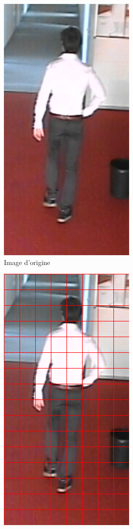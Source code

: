 \documentclass[12pt]{article}
\begin{document}
\begin{figure}[!ht]
\centering
\begin{subfigure}{.3\textwidth}
  \centering
  \includegraphics[width=.5\linewidth]{img/person.png}
  \caption{Image d'origine}
  \label{fig:kernel_sx}
\end{subfigure}%
\begin{subfigure}{.3\textwidth}
  \centering
  \includegraphics[width=.5\linewidth]{img/cell.png}

\end{subfigure}
\end{figure}
\end{document}
